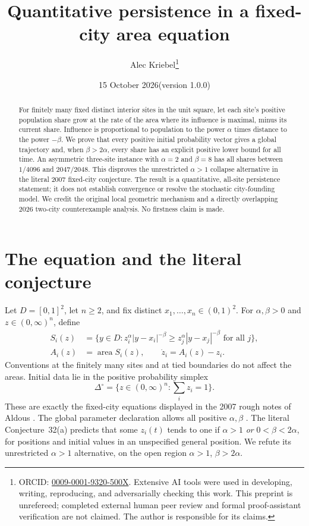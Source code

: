 \documentclass[11pt]{article}
\title{Quantitative persistence in a fixed-city area equation}
\author{Alec Kriebel\thanks{ORCID: \href{https://orcid.org/0009-0001-9320-500X}{0009-0001-9320-500X}. Extensive AI tools were used in developing, writing, reproducing, and adversarially checking this work. This preprint is unrefereed; completed external human peer review and formal proof-assistant verification are not claimed. The author is responsible for its claims.}}
\date{15 October 2026\quad (version 1.0.0)}
\newcommand{\area}{\operatorname{area}}
\begin{document}
\maketitle
\begin{abstract}
For finitely many fixed distinct interior sites in the unit square, let each site's positive population share grow at the rate of the area where its influence is maximal, minus its current share. Influence is proportional to population to the power $\alpha$ times distance to the power $-\beta$. We prove that every positive initial probability vector gives a global trajectory and, when $\beta>2\alpha$, every share has an explicit positive lower bound for all time. An asymmetric three-site instance with $\alpha=2$ and $\beta=8$ has all shares between $1/4096$ and $2047/2048$. This disproves the unrestricted $\alpha>1$ collapse alternative in the literal 2007 fixed-city conjecture. The result is a quantitative, all-site persistence statement; it does not establish convergence or resolve the stochastic city-founding model. We credit the original local geometric mechanism and a directly overlapping 2026 two-city counterexample analysis. No firstness claim is made.
\end{abstract}

\section{The equation and the literal conjecture}

Let $D=[0,1]^2$, let $n\geq2$, and fix distinct $x_1,\ldots,x_n\in(0,1)^2$. For $\alpha,\beta>0$ and $z\in(0,\infty)^n$, define
\begin{align}
 S_i(z)&=\{y\in D:z_i^\alpha|y-x_i|^{-\beta}
                      \geq z_j^\alpha|y-x_j|^{-\beta}\text{ for all }j\},\label{cells}\\
 A_i(z)&=\area S_i(z),\qquad
 \dot z_i=A_i(z)-z_i.\label{ode}
\end{align}
Conventions at the finitely many sites and at tied boundaries do not affect the areas. Initial data lie in the positive probability simplex
\[
 \Delta^\circ=\{z\in(0,\infty)^n:\textstyle\sum_i z_i=1\}.
\]
These are exactly the fixed-city equations displayed in the 2007 rough notes of Aldous \cite[\S6.4, p.~40]{Ald07}. The global parameter declaration allows all positive $\alpha,\beta$ \cite[p.~2]{Ald07}. The literal Conjecture~32(a) predicts that some $z_i(t)$ tends to one if $\alpha>1$ \emph{or} $0<\beta<2\alpha$, for positions and initial values in an unspecified general position. We refute its unrestricted $\alpha>1$ alternative, on the open region $\alpha>1$, $\beta>2\alpha$.
\end{document}

